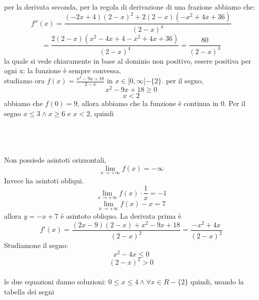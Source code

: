 \documentclass{article}
\begin{document}
per la derivata seconda, per la regola di derivazione di una frazione abbiamo che:
\[
f''(x) = \frac{(-2x+4)(2-x)^2+2(2-x)(-x^2+4x+36)}{(2-x)^4} 
\]
\[
= \frac{2(2-x)(x^2-4x+4-x^2+4x+36)}{(2-x)^4}
= \frac{80}{(2-x)^3}
\]
la quale si vede chiaramente in base al dominio non positivo, essere positiva per ogni x: la funzione è sempre convessa.\\
studiamo ora $f(x) = \frac{x^2 - 9x + 18}{2-x}$ in $x \in [0, \infty[ - \{2\}$.
per il segno,
\[
x^2-9x+18 \geq 0
\]
\[
x < 2
\]
abbiamo che $f(0) = 9$, allora abbiamo che la funzione è continua in 0. Per il segno 
$x \leq 3 \land x \geq 6 $ e $x < 2$, quindi
\\\\
\\\\
Non possiede asintoti orizzontali,
\[
\lim_{x \to +\infty} f(x) = -\infty
\]
Invece ha asintoti obliqui.
\[
\lim_{x \to +\infty} f(x) \cdot \frac{1}{x} = -1
\]
\[
\lim_{x \to +\infty} f(x) -x =  7
\]
allora $y = -x + 7$ è asintoto obliquo. La derivata prima è\\
\[f'(x) = \frac{(2x-9)(2-x) + x^2 -9x + 18}{(2-x)^2} = \frac{-x^2 + 4x}{(2-x)^2}
\]
Studiamone il segno:
\[
x^2 - 4x \leq 0
\]
\[
(2-x)^2 > 0
\]
\\
le due equazioni danno soluzioni: $0 \leq x  \leq 4 \land \forall x \in R-\{2\}$ quindi, usando la tabella dei segni
\\\\
\\\\
\end{document}
